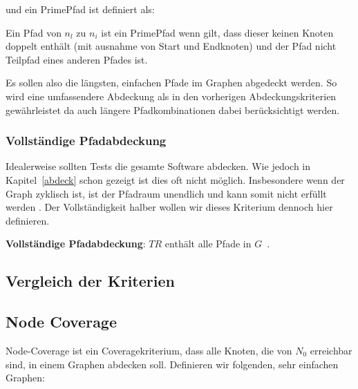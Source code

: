 und ein PrimePfad ist definiert als:

\begin{definition}
    Ein Pfad von $n_{l}$ zu $n_{i}$ ist ein PrimePfad wenn gilt, dass dieser keinen Knoten doppelt enthält (mit ausnahme von Start und Endknoten) und
    der Pfad nicht Teilpfad eines anderen Pfades ist.
\end{definition}

Es sollen also die längsten, einfachen Pfade im Graphen abgedeckt werden.
So wird eine umfassendere Abdeckung als in den vorherigen Abdeckungskriterien gewährleistet da auch längere Pfadkombinationen dabei berücksichtigt werden.

\subsubsection{Vollständige Pfadabdeckung}

Idealerweise sollten Tests die gesamte Software abdecken.
Wie jedoch in Kapitel~\ref{abdeck} schon gezeigt ist dies oft nicht möglich.
Insbesondere wenn der Graph zyklisch ist, ist der Pfadraum unendlich und kann somit nicht erfüllt werden \cite[vgl. S. 36 ]{software-testing}.
Der Vollständigkeit halber wollen wir dieses Kriterium dennoch hier definieren.

\begin{definition}
    \textbf{Vollständige Pfadabdeckung}: $TR$ enthält alle Pfade in $G$~\cite[vgl. Criterion 2.7]{software-testing}.
    \label{completecov}
\end{definition}

\subsection{Vergleich der Kriterien}

















\subsection{Node Coverage}

Node-Coverage ist ein Coveragekriterium, dass alle Knoten, die von $N_{0}$ erreichbar sind, in einem Graphen abdecken soll.
Definieren wir folgenden, sehr einfachen Graphen:

